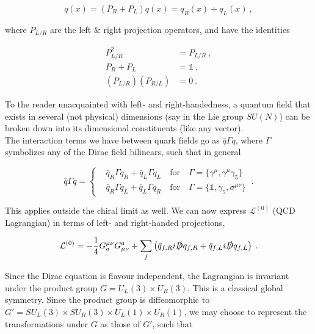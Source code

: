 \documentclass[10pt,twoside]{report}
\begin{document}
	\begin{equation}
	q(x) = (P_R+P_L)q(x) = q_R(x) + q_L(x)\:,
	\end{equation}
	
	\noindent where $P_{L/R}$ are the left \& right projection operators, and have the identities
	
	\begin{align}
		P_{L/R}^2 &= P_{L/R}\:, \\
		P_{R} + P_{L} &= \mathds{1}\:, \\ 
		\left(P_{L/R}\right)\left(P_{R/L}\right) &= 0 \:.
	\end{align}
	
	To the reader unacquainted with left- and right-handedness, a quantum field that exists in several (not physical) dimensions (say in the Lie group $SU(N)$) can be broken down into its dimensional constituents (like any vector).\\
	
	The interaction terms we have between quark fields go as $\bar{q}\Gamma q$, where $\Gamma$ symbolizes any of the Dirac field bilinears, such that in general
	
	\begin{equation}
	\bar{q}\Gamma q = \begin{cases}
	&\bar{q}_R\Gamma q_R + \bar{q}_L\Gamma q_L \quad\text{for}\quad \Gamma=\{\gamma^\mu, \gamma^\mu\gamma_5\}\\
	&\bar{q}_R\Gamma q_L + \bar{q}_L\Gamma q_R \quad\text{for}\quad \Gamma=\{\mathds{1}, \gamma_5, \sigma^{\mu\nu}\}
	\end{cases} \:.
	\end{equation}
	
	This applies outside the chiral limit as well. We can now express $\mathcal{L}^{(0)}$ (QCD Lagrangian) in terms of left- and right-handed projections,
	
	\begin{equation}
	\mathcal{L}^{(0)} = -\frac{1}{4}G_a^{\mu\nu}G_{\mu\nu}^a + \sum_{f} \left( \bar{q}_{f,R}i\slashed Dq_{f,R} + \bar{q}_{f,L}i\slashed Dq_{f,L} \right)\:.
	\end{equation}
	
	Since the Dirac equation is flavour independent, the Lagrangian is invariant under the product group $G=U_L(3)\times U_R(3)$. This is a classical global symmetry. Since the product group is diffeomorphic to $G'=SU_L(3)\times SU_R(3)\times U_L(1)\times U_R(1)$, we may choose to represent the transformations under $G$ as those of $G'$, such that
	
\end{document}
